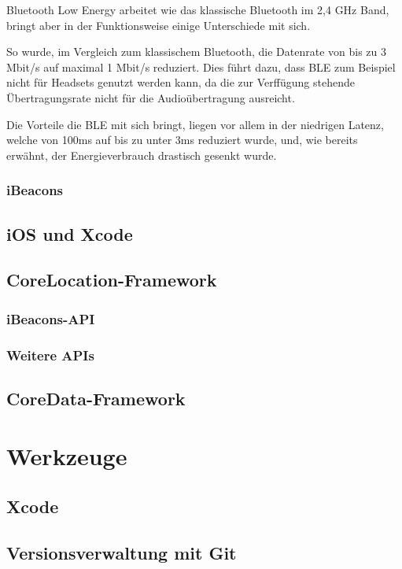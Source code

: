 \documentclass[liststotoc,a4paper, 12pt]{scrartcl}
\begin{document}
Bluetooth Low Energy arbeitet wie das klassische Bluetooth im 2,4 GHz Band, bringt aber in der Funktionsweise einige Unterschiede mit sich.

So wurde, im Vergleich zum klassischem Bluetooth, die Datenrate von bis zu 3 Mbit/s auf maximal 1 Mbit/s reduziert. Dies führt dazu, dass BLE zum Beispiel nicht für Headsets genutzt werden kann, da die zur Verffügung stehende Übertragungsrate nicht für die Audioübertragung ausreicht.

Die Vorteile die BLE mit sich bringt, liegen vor allem in der niedrigen Latenz, welche von 100ms auf bis zu unter 3ms reduziert wurde, und, wie bereits erwähnt, der Energieverbrauch drastisch gesenkt wurde.






\subsubsection{iBeacons}

\subsection{iOS und Xcode}

\subsection{CoreLocation-Framework}
\subsubsection{iBeacons-API}
\subsubsection{Weitere APIs}

\subsection{CoreData-Framework}


\section{Werkzeuge}
\subsection{Xcode}
\subsection{Versionsverwaltung mit Git}
\end{document}
